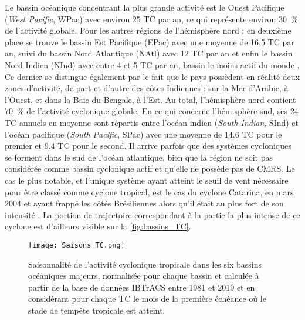 \documentclass[../main.tex]{subfiles}
\begin{document}
Le bassin océanique concentrant la plus grande activité est le Ouest Pacifique (\textit{West Pacific}, WPac) avec environ \num{25} TC par an, ce qui représente environ \SI{30}{\percent} de l'activité globale. Pour les autres régions de l'hémisphère nord ; en deuxième place se trouve le bassin Est Pacifique (EPac) avec une moyenne de \num{16.5} TC par an, suivi du bassin Nord Atlantique (NAtl) avec \num{12} TC par an et enfin le bassin Nord Indien (NInd) avec entre \num{4} et \num{5} TC par
an, bassin le moins actif du monde \parencite{gray_global_1968,lander_look_1998,schreck_impact_2014}. Ce dernier se distingue également par le fait que le pays possèdent en réalité deux zones d'activité, de part et d'autre des côtes Indiennes : sur la Mer d'Arabie, à l'Ouest, et dans la Baie du Bengale, à l'Est. Au total, l'hémisphère nord contient \SI{70}{\percent} de l'activité cyclonique globale. En ce qui concerne l'hémisphère sud, ses \num{24} TC annuels en moyenne sont répartis entre l'océan indien (\textit{South Indian}, SInd) et l'océan pacifique (\textit{South Pacific}, SPac) avec une moyenne de \num{14.6} TC pour le premier et \num{9.4} TC pour le second. Il arrive parfois que des systèmes cycloniques se forment dans le sud de l'océan atlantique, bien que la région ne soit pas considérée comme
bassin cyclonique actif et qu'elle ne possède pas de CMRS. Le cas le plus notable, et l'unique système ayant atteint le seuil de vent nécessaire pour être classé comme cyclone tropical, est le cas du cyclone Catarina, en mars 2004 et ayant frappé les côtés Brésiliennes alors qu'il était au plus fort de son intensité \parencite{mctaggart-cowan_analysis_2006}. La portion de trajectoire correspondant à la partie la plus intense de ce cyclone est d'ailleurs visible sur la \cref{fig:bassins_TC}.

\begin{figure}[t]
    \centering
    \texttt{[image: Saisons\_TC.png]}
    \caption{Saisonnalité de l'activité cyclonique tropicale dans les six bassins océaniques majeurs, normalisée pour chaque bassin et calculée à partir de la base de données IBTrACS entre 1981 et 2019 et en considérant pour chaque TC le mois de la première échéance où le stade de tempête tropicale est atteint.}
    \label{fig:saisons_TC}
\end{figure}
\end{document}
